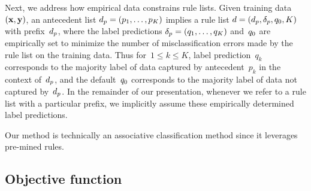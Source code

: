 Next, we address how empirical data constrains rule lists.
%
Given training data~${(\mathbf{x}, \mathbf{y})}$,
an antecedent list ${d_p = (p_1, \dots, p_K)}$
implies a rule list ${{d} = (d_p, \delta_p, q_0, K)}$
with prefix~$d_p$, where the label predictions
${\delta_p = (q_1, \dots, q_K)}$ and~$q_0$ are empirically set
to minimize the number of misclassification errors made by
the rule list on the training data.
%
Thus for~${1 \le k \le K}$, label prediction~$q_k$ corresponds to the
majority label of data captured by antecedent~$p_k$ in the context of~$d_p$,
and the default~$q_0$ corresponds to the majority label of data
not captured by~$d_p$.
%
In the remainder of our presentation, whenever we refer to a rule list with a
particular prefix, we implicitly assume these empirically determined label predictions.

Our method is technically an associative classification method since it
leverages pre-mined rules.

\subsection{Objective function}
\label{sec:objective}


